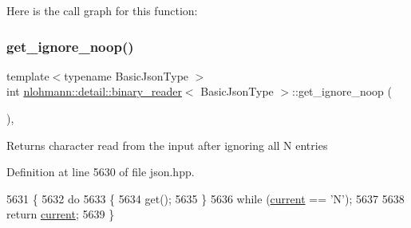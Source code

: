 Here is the call graph for this function\+:
\mbox{\label{classnlohmann_1_1detail_1_1binary__reader_a372a4b61f0c57f3d4f1e9484a416a3cd}} 
\subsubsection{\texorpdfstring{get\+\_\+ignore\+\_\+noop()}{get\_ignore\_noop()}}
{\footnotesize\ttfamily template$<$typename Basic\+Json\+Type $>$ \\
int \hyperlink{classnlohmann_1_1detail_1_1binary__reader}{nlohmann\+::detail\+::binary\+\_\+reader}$<$ Basic\+Json\+Type $>$\+::get\+\_\+ignore\+\_\+noop (\begin{DoxyParamCaption}{ }\end{DoxyParamCaption})\hspace{0.3cm}{\ttfamily [inline]}, {\ttfamily [private]}}

\begin{DoxyReturn}{Returns}
character read from the input after ignoring all \textquotesingle{}N\textquotesingle{} entries 
\end{DoxyReturn}


Definition at line 5630 of file json.\+hpp.


\begin{DoxyCode}
5631     \{
5632         \textcolor{keywordflow}{do}
5633         \{
5634             \textcolor{keyword}{get}();
5635         \}
5636         \textcolor{keywordflow}{while} (\hyperlink{classnlohmann_1_1detail_1_1binary__reader_a7e994e201b215cd6d6ae28a1853f43e0}{current} == \textcolor{charliteral}{'N'});
5637 
5638         \textcolor{keywordflow}{return} \hyperlink{classnlohmann_1_1detail_1_1binary__reader_a7e994e201b215cd6d6ae28a1853f43e0}{current};
5639     \}
\end{DoxyCode}
\mbox{\label{classnlohmann_1_1detail_1_1binary__reader_a7adeb751743afe4233d75d351252bc93}} 
